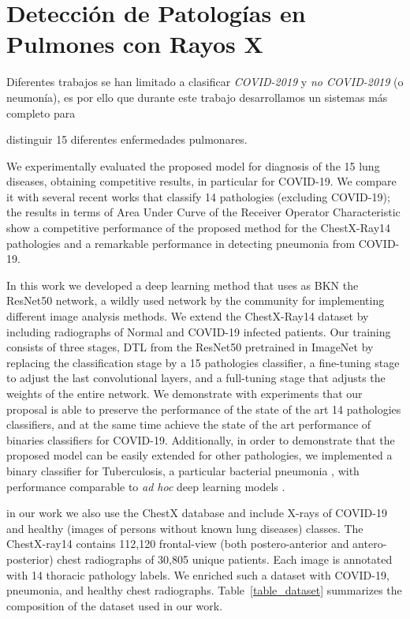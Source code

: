\section{Detección de Patologías en Pulmones con Rayos X}

Diferentes trabajos se han limitado a clasificar \textit{COVID-2019} y \textit{no COVID-2019} (o
neumonía), es por ello que durante este trabajo desarrollamos un sistemas más completo para {
distinguir 15 diferentes enfermedades pulmonares.

We experimentally evaluated the proposed model for diagnosis of the 15 lung diseases, obtaining
competitive results, in particular for COVID-19. We compare it with several recent works that classify
14 pathologies (excluding COVID-19); the results in terms of Area Under Curve of the Receiver Operator
Characteristic show a competitive performance of the proposed method for the ChestX-Ray14 pathologies
and a remarkable performance in detecting pneumonia from COVID-19.

In this work we developed a deep learning method that uses as BKN the ResNet50 network, a wildly
used network by the community for implementing different image analysis methods. We extend the
ChestX-Ray14 dataset by including radiographs of Normal and COVID-19 infected patients. Our training
consists of three stages, DTL from the ResNet50 pretrained in ImageNet by replacing the classification
stage by a 15 pathologies classifier, a fine-tuning stage to adjust the last convolutional layers,
and a full-tuning stage that adjusts the weights of the entire network. We demonstrate with experiments
that our proposal is able to preserve the performance of the state of the art 14 pathologies classifiers,
and at the same time achieve the state of the art performance of binaries classifiers for COVID-19.
Additionally, in order to demonstrate that the proposed model can be easily extended for other
pathologies, we implemented a binary classifier for Tuberculosis, a particular bacterial pneumonia
\cite{stirenko2018chest}, with performance comparable to \emph{ad hoc} deep learning models
\cite{puttagunta2021detection}.

in our work we also use the ChestX database \cite{wang2017chestx} and include X-rays of COVID-19 and
healthy (images of persons without known lung diseases) classes. The ChestX-ray14 contains 112,120
frontal-view (both postero-anterior and antero-posterior) chest radiographs of 30,805 unique patients.
Each image is annotated with 14 thoracic pathology labels. We enriched such a dataset with COVID-19,
pneumonia, and healthy chest radiographs. Table~\ref{table_dataset} summarizes the composition of
the dataset used in our work.

}
